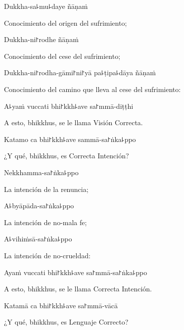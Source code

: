 Dukkha-sa꜕mu꜕daye ñāṇaṁ

\begin{english}
	Conocimiento del origen del sufrimiento;
\end{english}

Dukkha-ni꜓rodhe ñāṇaṁ

\begin{english}
	Conocimiento del cese del sufrimiento;
\end{english}

Dukkha-ni꜓rodha-gāmi꜓ni꜓yā pa꜕ṭipa꜕dāya ñāṇaṁ

\begin{english}
	Conocimiento del camino que lleva al cese del sufrimiento:
\end{english}

A꜕yaṁ vuccati bhi꜓kkh꜕ave sa꜓mmā-diṭṭhi

\begin{english}
	A esto, bhikkhus, se le llama Visión Correcta.
\end{english}

Katamo ca bhi꜓kkh꜕ave sammā-sa꜓ṅka꜕ppo

\begin{english}
	¿Y qué, bhikkhus, es Correcta Intención?
\end{english}

\ifaivedition
\clearpage
\fi

Nekkhamma-sa꜓ṅka꜕ppo

\begin{english}
	La intención de la renuncia;
\end{english}

A꜕byāpāda-sa꜓ṅka꜕ppo

\begin{english}
	La intención de no-mala fe;
\end{english}

A꜕vihiṁsā-sa꜓ṅka꜕ppo

\begin{english}
	La intención de no-crueldad:
\end{english}

Ayaṁ vuccati bhi꜓kkh꜕ave sa꜓mmā-sa꜓ṅka꜕ppo

\begin{english}
	A esto, bhikkhus, se le llama Correcta Intención.
\end{english}

Katamā ca bhi꜓kkh꜕ave sa꜓mmā-vācā

\begin{english}
	¿Y qué, bhikkhus, es Lenguaje Correcto?
\end{english}

